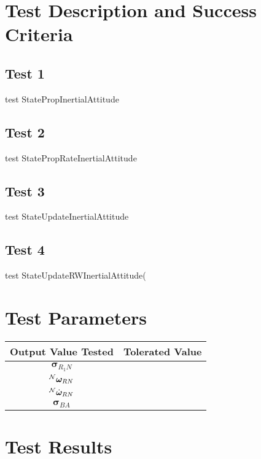 
\newpage

\section{Test Description and Success Criteria}

\subsection{Test 1}
test StatePropInertialAttitude

\subsection{Test 2}
test StatePropRateInertialAttitude

\subsection{Test 3}
test StateUpdateInertialAttitude

\subsection{Test 4}
test StateUpdateRWInertialAttitude(

\section{Test Parameters}

\begin{table}[ht]
\centering
\begin{tabular}{cc}
\hline
\hline
\textbf{Output Value Tested}     & \textbf{Tolerated Value} \\ \hline
${\bm \sigma}_{R_{1}N}$          &                     \\
$^{\cal N}{\bm \omega}_{RN}$     &                      \\
$^{\cal N}\dot{\bm \omega}_{RN}$ &                      \\ 
${\bm \sigma}_{BA}$ &   \\ \hline
\hline
\end{tabular}
\end{table}

\section{Test Results}

